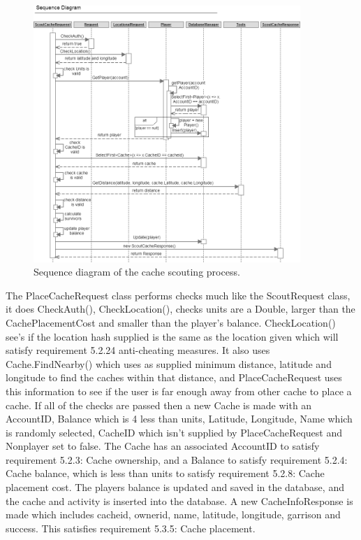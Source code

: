 \begin{figure}
    \centering
    \includegraphics[width=0.9\textwidth]{images/sequence/scoutCache}
    \caption{Sequence diagram of the cache scouting process.}
\end{figure}

The PlaceCacheRequest class performs checks much like the ScoutRequest class, it does CheckAuth(), CheckLocation(), checks units are a Double, larger than the CachePlacementCost and smaller than the player's balance. CheckLocation() see's if the location hash supplied is the same as the location given which will satisfy requirement 5.2.24 anti-cheating measures. It also uses Cache.FindNearby() which uses as supplied minimum distance, latitude and longitude to find the caches within that distance, and PlaceCacheRequest uses this information to see if the user is far enough away from other cache to place a cache. If all of the checks are passed then a new Cache is made with an AccountID, Balance which is 4 less than units, Latitude, Longitude, Name which is randomly selected, CacheID which isn't supplied by PlaceCacheRequest and Nonplayer set to false. The Cache has an associated AccountID to satisfy requirement 5.2.3: Cache ownership, and a Balance to satisfy requirement 5.2.4: Cache balance, which is less than units to satisfy requirement 5.2.8: Cache placement cost. The players balance is updated and saved in the database, and the cache and activity is inserted into the database. A new CacheInfoResponse is made which includes cacheid, ownerid, name, latitude, longitude, garrison and success. This satisfies requirement 5.3.5: Cache placement.

